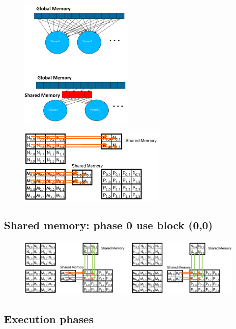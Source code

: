 \begin{figure}[ht]
	\centering
	\includegraphics[width=0.5\textwidth]{figure_parallel/sm_mm.png}
\end{figure}
\FloatBarrier



\begin{figure}[ht]
	\centering
	\includegraphics[width=0.65\textwidth]{figure_parallel/phase0.png}
\end{figure}
\FloatBarrier

\subsection{Shared memory: phase 0 use block (0,0)}

\begin{figure}[ht]
	\centering
	\includegraphics[width=1\textwidth]{figure_parallel/phase0_use.png}
\end{figure}
\FloatBarrier

\subsection{Execution phases}

